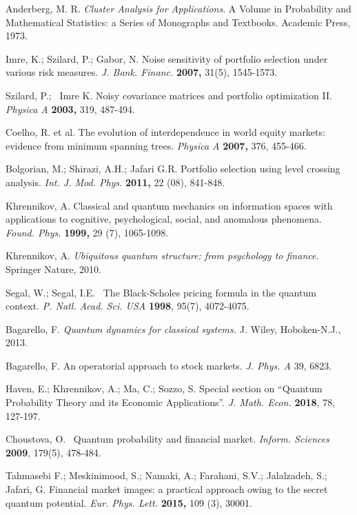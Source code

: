 \documentclass[journal,article,submit,moreauthors,pdftex]{Definitions/mdpi}
\begin{document}
\begin{thebibliography}{99}
	 Anderberg, M. R. \textit{Cluster Analysis for
		Applications}. A Volume in Probability and Mathematical Statistics: a Series
	of Monographs and Textbooks. Academic Press, 1973.
	
	 Imre, K.; Szilard, P.; Gabor, N. Noise sensitivity of
	portfolio selection under various risk measures. \textit{J. Bank. Financ. }%
	\textbf{2007, } 31(5), 1545-1573.
	
	 Szilard, P.; \ Imre K. Noisy covariance matrices and
	portfolio optimization II. \textit{Physica A} \textbf{2003, }319, 487-494.
	
	 Coelho, R. et al. The evolution of interdependence in world
	equity markets: evidence from minimum spanning trees. \textit{Physica A} 
	\textbf{2007, }376, 455-466.
	
	 Bolgorian, M.; Shirazi, A.H.;  Jafari G.R. Portfolio
	selection using level crossing analysis. \textit{Int. J. Mod. Phys.} \textbf{%
		2011, }22 (08), 841-848.
	
	 Khrennikov, A. Classical and quantum mechanics on
	information spaces with applications to cognitive, psychological, social,
	and anomalous phenomena. \textit{Found. Phys.} \textbf{1999, }29 (7),
	1065-1098.
	
	 Khrennikov, A. \textit{Ubiquitous quantum structure:
		from psychology to finance.} Springer Nature, 2010.
	
	 Segal, W.; Segal, I.E. \ The Black-Scholes pricing formula
	in the quantum context. \textit{P. Natl. Acad. Sci. USA} \textbf{1998},
	95(7), 4072-4075.
	
	 Bagarello, F. \textit{Quantum dynamics for classical
		systems.} J. Wiley, Hoboken-N.J., 2013.
	
	 Bagarello, F. An operatorial approach to stock
	markets. \textit{J. Phys. A} 39, 6823.
	
	 Haven, E.; Khrennikov, A.; Ma, C.; Sozzo, S. Special section
	on \textquotedblleft Quantum Probability Theory and its Economic
	Applications\textquotedblright . \textit{J. Math. Econ. }\textbf{2018}, 78,
	127-197.
	
	 Choustova, O. \ Quantum probability and financial
	market. \textit{Inform. Sciences }\textbf{2009}, 179(5), 478-484.
	
	 Tahmasebi F.; Meskinimood, S.; Namaki, A.; Farahani,
	S.V.; Jalalzadeh, S.; Jafari, G. Financial market images: a practical
	approach owing to the secret quantum potential. \textit{Eur. Phys. Lett.} 
	\textbf{2015, }109 (3), 30001.
	

\end{thebibliography}
\end{document}
